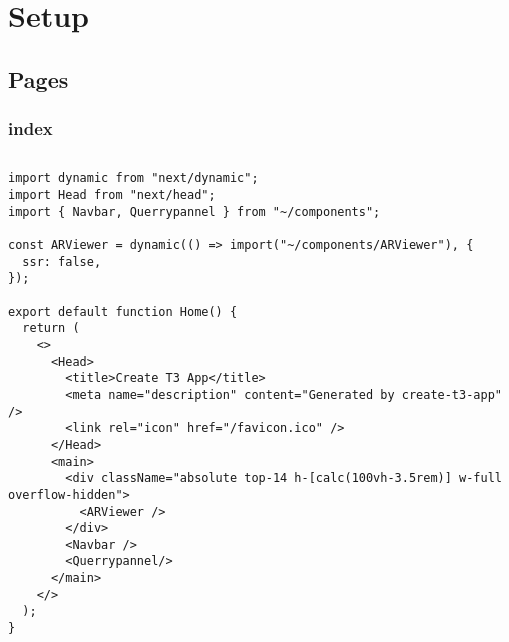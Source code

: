 \chapter{Setup}

\section {Pages}
\subsection{index}
\inputminted{tsx}{figures/snippets/src/pages/index.tsx}
\begin{verbatim}
import dynamic from "next/dynamic";
import Head from "next/head";
import { Navbar, Querrypannel } from "~/components";

const ARViewer = dynamic(() => import("~/components/ARViewer"), {
  ssr: false,
});

export default function Home() {
  return (
    <>
      <Head>
        <title>Create T3 App</title>
        <meta name="description" content="Generated by create-t3-app" />
        <link rel="icon" href="/favicon.ico" />
      </Head>
      <main>
        <div className="absolute top-14 h-[calc(100vh-3.5rem)] w-full overflow-hidden">
          <ARViewer />
        </div>
        <Navbar />
        <Querrypannel/>
      </main>
    </>
  );
}
\end{verbatim}
\newpage
